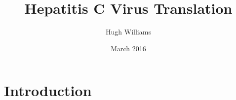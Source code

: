 \documentclass[a4paper,11pt]{article}
\begin{document}
	\title{Hepatitis C Virus Translation}
	\author{Hugh Williams}
	\date{March 2016}
	\maketitle

	\section*{Introduction}
	\lipsum[2]
\end{document}

